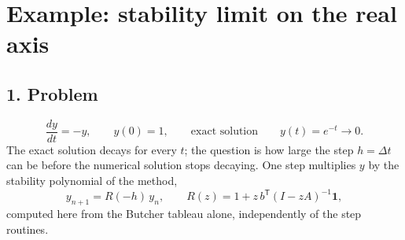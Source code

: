 \documentclass[11pt,a4paper]{article}
\begin{document}
\section*{Example: stability limit on the real axis}

\subsection*{1. Problem}
\begin{equation*}
  \frac{dy}{dt} = -y, \qquad y(0) = 1,
  \qquad\text{exact solution}\qquad y(t) = e^{-t} \to 0 .
\end{equation*}
The exact solution decays for every $t$; the question is how large the step
$h = \Delta t$ can be before the numerical solution stops decaying. One step
multiplies $y$ by the stability polynomial of the method,
\begin{equation*}
  y_{n+1} = R(-h)\, y_n, \qquad
  R(z) = 1 + z\, b^{\mathsf T} (I - zA)^{-1} \mathbf{1},
\end{equation*}
computed here from the Butcher tableau alone, independently of the step
routines.
\begin{center}
\small

\end{center}
\end{document}
